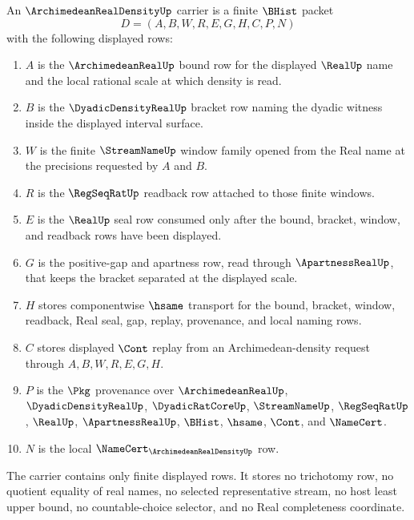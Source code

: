 \begin{definition}
\label{def:archimedean-real-density-carrier}
An $\ArchimedeanRealDensityUp$ carrier is a finite $\BHist$ packet
$$
D=(A,B,W,R,E,G,H,C,P,N)
$$
with the following displayed rows:
\begin{enumerate}
\item $A$ is the $\ArchimedeanRealUp$ bound row for the displayed
$\RealUp$ name and the local rational scale at which density is read.
\item $B$ is the $\DyadicDensityRealUp$ bracket row naming the dyadic witness
inside the displayed interval surface.
\item $W$ is the finite $\StreamNameUp$ window family opened from the Real
name at the precisions requested by $A$ and $B$.
\item $R$ is the $\RegSeqRatUp$ readback row attached to those finite windows.
\item $E$ is the $\RealUp$ seal row consumed only after the bound, bracket,
window, and readback rows have been displayed.
\item $G$ is the positive-gap and apartness row, read through
$\ApartnessRealUp$, that keeps the bracket separated at the displayed scale.
\item $H$ stores componentwise $\hsame$ transport for the bound, bracket,
window, readback, Real seal, gap, replay, provenance, and local naming rows.
\item $C$ stores displayed $\Cont$ replay from an Archimedean-density request
through $A,B,W,R,E,G,H$.
\item $P$ is the $\Pkg$ provenance over $\ArchimedeanRealUp$,
$\DyadicDensityRealUp$, $\DyadicRatCoreUp$, $\StreamNameUp$, $\RegSeqRatUp$,
$\RealUp$, $\ApartnessRealUp$, $\BHist$, $\hsame$, $\Cont$, and $\NameCert$.
\item $N$ is the local $\NameCert_{\ArchimedeanRealDensityUp}$ row.
\end{enumerate}
The carrier contains only finite displayed rows. It stores no trichotomy row,
no quotient equality of real names, no selected representative stream, no
host least upper bound, no countable-choice selector, and no Real completeness
coordinate.
\end{definition}

